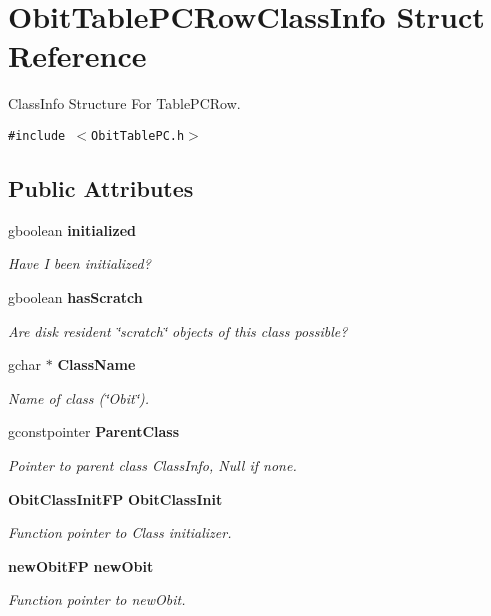\section{Obit\-Table\-PCRow\-Class\-Info Struct Reference}
\label{structObitTablePCRowClassInfo}
Class\-Info Structure For Table\-PCRow.  


{\tt \#include $<$Obit\-Table\-PC.h$>$}

\subsection*{Public Attributes}
\begin{CompactItemize}
\item 
gboolean {\bf initialized}
\begin{CompactList}\small\item\em Have I been initialized? \item\end{CompactList}\item 
gboolean {\bf has\-Scratch}
\begin{CompactList}\small\item\em Are disk resident \char`\"{}scratch\char`\"{} objects of this class possible? \item\end{CompactList}\item 
gchar $\ast$ {\bf Class\-Name}
\begin{CompactList}\small\item\em Name of class (\char`\"{}Obit\char`\"{}). \item\end{CompactList}\item 
gconstpointer {\bf Parent\-Class}
\begin{CompactList}\small\item\em Pointer to parent class Class\-Info, Null if none. \item\end{CompactList}\item 
{\bf Obit\-Class\-Init\-FP} {\bf Obit\-Class\-Init}
\begin{CompactList}\small\item\em Function pointer to Class initializer. \item\end{CompactList}\item 
{\bf new\-Obit\-FP} {\bf new\-Obit}
\begin{CompactList}\small\item\em Function pointer to new\-Obit. \item\end{CompactList}\item 

\end{CompactItemize}
